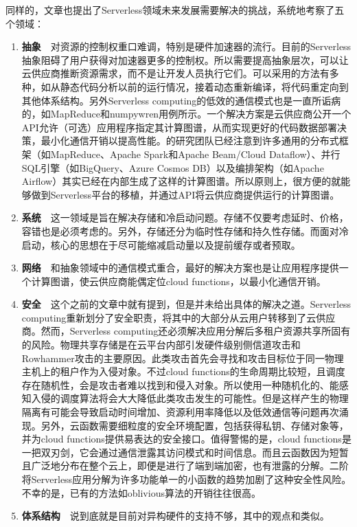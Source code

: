 \documentclass[11pt]{article}
\begin{document}
同样的，文章\cite{jonas2019cloud}也提出了Serverless领域未来发展需要解决的挑战，系统地考察了五个领域：
\begin{enumerate}
	\item \textbf{抽象}\ \ 对资源的控制权重口难调，特别是硬件加速器的流行。目前的Serverless抽象阻碍了用户获得对加速器更多的控制权。所以需要提高抽象层次，可以让云供应商推断资源需求，而不是让开发人员执行它们。可以采用的方法有多种，如从静态代码分析以前的运行情况，接着动态重新编译，将代码重定向到其他体系结构。另外Serverless computing的低效的通信模式也是一直所诟病的，如MapReduce和numpywren用例所示。一个解决方案是云供应商公开一个API允许（可选）应用程序指定其计算图谱，从而实现更好的代码数据部署决策，最小化通信开销以提高性能。\cite{jonas2019cloud}的研究团队已经注意到许多通用的分布式框架（如MapReduce、Apache Spark和Apache Beam/Cloud Dataflow）、并行SQL引擎（如BigQuery、Azure Cosmos DB）以及编排架构（如Apache Airflow）其实已经在内部生成了这样的计算图谱。所以原则上，很方便的就能够做到Serverless平台的移植，并通过API将云供应商提供运行的计算图谱。
	\item \textbf{系统}\ \ 这一领域是旨在解决存储和冷启动问题。存储不仅要考虑延时、价格，容错也是必须考虑的。另外，存储还分为临时性存储和持久性存储。而面对冷启动，核心的思想在于尽可能缩减启动量以及提前缓存或者预取。
	\item \textbf{网络}\ \ 和抽象领域中的通信模式重合，最好的解决方案也是让应用程序提供一个计算图谱，使云供应商能偶定位cloud functions，以最小化通信开销。
	\item \textbf{安全}\ \ 这个之前的文章\cite{hellerstein2018serverless}中就有提到，但是并未给出具体的解决之道。Serverless computing重新划分了安全职责，将其中的大部分从云用户转移到了云供应商。然而，Serverless computing还必须解决应用分解后多租户资源共享所固有的风险。物理共享存储是在云平台内部引发硬件级别侧信道攻击和Rowhammer攻击的主要原因。此类攻击首先会寻找和攻击目标位于同一物理主机上的租户作为入侵对象。不过cloud functions的生命周期比较短，且调度存在随机性，会是攻击者难以找到和侵入对象。所以使用一种随机化的、能感知入侵的调度算法将会大大降低此类攻击发生的可能性。但是这样产生的物理隔离有可能会导致启动时间增加、资源利用率降低以及低效通信等问题再次涌现。另外，云函数需要细粒度的安全环境配置，包括获得私钥、存储对象等，并为cloud functions提供易表达的安全接口。值得警惕的是，cloud functions是一把双刃剑，它会通过通信泄露其访问模式和时间信息。而且云函数因为短暂且广泛地分布在整个云上，即便是进行了端到端加密，也有泄露的分解。二阶将Serverless应用分解为许多功能单一的小函数的趋势加剧了这种安全性风险。不幸的是，已有的方法如oblivious算法的开销往往很高。
	\item \textbf{体系结构}\ \ 说到底就是目前对异构硬件的支持不够，其中的观点和\cite{hellerstein2018serverless}类似。
\end{enumerate}
\end{document}
